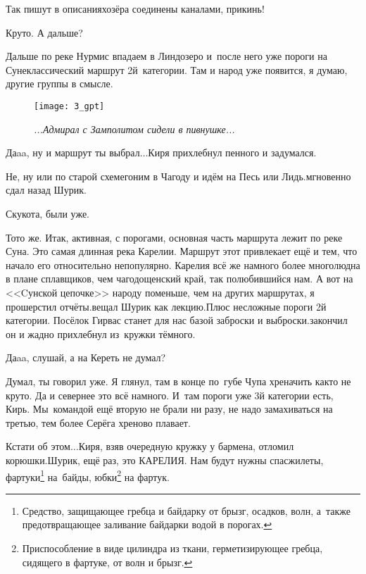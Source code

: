 \diagdash Так пишут в описаниях\mdash озёра соединены каналами, прикинь!

\diagdash Круто. А дальше? 

\diagdash Дальше по реке Нурмис впадаем в Линдозеро и~после него уже пороги на Суне\mdash классический маршрут 2\sdash й~категории. Там и народ уже появится, я думаю, другие группы в смысле.

	\begin{figure}[h]
	\centering
	\texttt{[image: 3\_gpt]}
	\caption{\small\textit{...Адмирал с Замполитом сидели в пивнушке...}}
	\end{figure}

\diagdash Да\sdash a\sdash a, ну и маршрут ты выбрал$\ldots$\mdash Киря прихлебнул пенного и задумался.

\diagdash Не, ну или по старой схеме\mdash гоним в Чагоду и идём на Песь или Лидь.\mdash мгновенно сдал назад Шурик.

\diagdash Скукота, были уже.

\diagdash То\sdash то же. Итак, активная, с порогами, основная часть маршрута лежит по реке Суна. Это самая длинная река Карелии. Маршрут этот привлекает ещё и тем, что начало его относительно непопулярно. Карелия всё же намного более многолюдна в плане сплавщиков, чем чагодощенский край, так полюбившийся нам. А вот на <<Cунской цепочке>> народу поменьше, чем на других маршрутах, я прошерстил отчёты.\mdash вещал Шурик как лекцию.\mdash Плюс несложные пороги 2\sdash й категории. Посёлок Гирвас станет для нас базой заброски и выброски.\mdash закончил он и жадно прихлебнул из~кружки тёмного.

\diagdash Да\sdash a\sdash a, слушай, а на Кереть не думал?

\diagdash Думал, ты говорил уже. Я глянул, там в конце по~губе Чупа хреначить как\sdash то не круто. Да и севернее это всё намного. И~там пороги уже 3\sdash й категории есть, Кирь. Мы~командой ещё вторую не брали ни разу, не надо замахиваться на третью, тем более Серёга хреново плавает. 

\renewcommand*{\thefootnote}{\arabic{footnote}}
\diagdash Кстати об этом$\ldots$\mdash Киря, взяв очередную кружку у бармена, отломил корюшки.\mdash Шурик, ещё раз, это КАРЕЛИЯ. Нам будут нужны спасжилеты, фартуки\footnote{Средство, защищающее гребца и байдарку от брызг, осадков, волн, а~также предотвращающее заливание байдарки водой в порогах.} на~байды, юбки\footnote{Приспособление в виде цилиндра из ткани, герметизирующее гребца, сидящего в фартуке, от волн и брызг.} на фартук.


